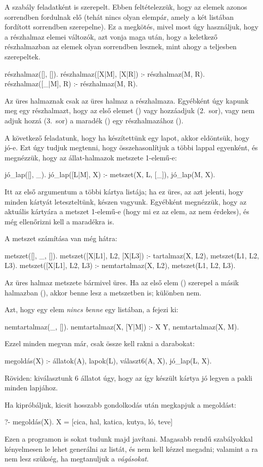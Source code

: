 A  szabály feladatként is szerepelt.
Ebben feltételezzük, hogy az elemek azonos
sorrendben fordulnak elő (tehát nincs olyan elempár,
amely a két listában fordított sorrendben
szerepelne). Ez a megkötés, mivel most úgy
használjuk, hogy a részhalmaz elemei változók, azt
vonja maga után, hogy a keletkező részhalmazban az
elemek olyan sorrendben lesznek, mint ahogy a
teljesben szerepeltek.
\begin{program}
részhalmaz([], []).
részhalmaz([X|M], [X|R]) :- részhalmaz(M, R).
részhalmaz([_|M], R) :- részhalmaz(M, R).
\end{program}
Az üres halmaznak csak az üres halmaz a
részhalmaza. Egyébként úgy kapunk meg egy
részhalmazt, hogy az első elemet () vagy
hozzáadjuk (2.~sor), vagy nem adjuk hozzá (3.~sor) a
maradék () egy részhalmazához ().

A következő feladatunk, hogy ha készítettünk egy
lapot, akkor eldöntsük, hogy jó-e. Ezt úgy tudjuk
megtenni, hogy összehasonlítjuk a többi lappal
egyenként, és megnézzük, hogy az állat-halmazok
metszete 1-elemű-e:
\begin{program}
jó_lap([], _).
jó_lap([L|M], X) :- metszet(X, L, [_]), jó_lap(M, X).
\end{program}
Itt az első argumentum a többi kártya listája; ha ez
üres, az azt jelenti, hogy minden kártyát
leteszteltünk, készen vagyunk. Egyébként megnézzük,
hogy az aktuális kártyára a metszet 1-elemű-e (hogy
mi ez az elem, az nem érdekes), és még ellenőrizni
kell a maradékra is.

A metszet számítása van még hátra:
\begin{program}
metszet([], _, []).
metszet([X|L1], L2, [X|L3]) :-
    tartalmaz(X, L2), metszet(L1, L2, L3).
metszet([X|L1], L2, L3) :-
    nemtartalmaz(X, L2), metszet(L1, L2, L3).
\end{program}
Az üres halmaz metszete bármivel üres. Ha az első
elem () szerepel a másik halmazban (),
akkor benne lesz a metszetben is; különben nem.

Azt, hogy egy elem \emph{nincs benne} egy listában,
a  fejezi ki:
\begin{program}
nemtartalmaz(_, []).
nemtartalmaz(X, [Y|M]) :- X \= Y, nemtartalmaz(X, M).
\end{program}

Ezzel minden megvan már, csak össze kell rakni a
darabokat:
\begin{program}
megoldás(X) :-
    állatok(A), lapok(L),
    választ6(A, X), jó_lap(L, X).
\end{program}
Röviden: kiválasztunk 6 állatot úgy, hogy az így
készült kártya jó legyen a pakli minden lapjához.

Ha kipróbáljuk, kicsit hosszabb gondolkodás után
megkapjuk a megoldást:
\begin{query}
?- megoldás(X).
X = [cica, hal, katica, kutya, ló, teve]
\end{query}

Ezen a programon is sokat tudunk majd
javítani. Magasabb rendű szabályokkal kényelmesen le
lehet generálni az  listát, és nem kell
kézzel megadni; valamint a ra nem
lesz szükség, ha megtanuljuk a \emph{vágásokat}.
